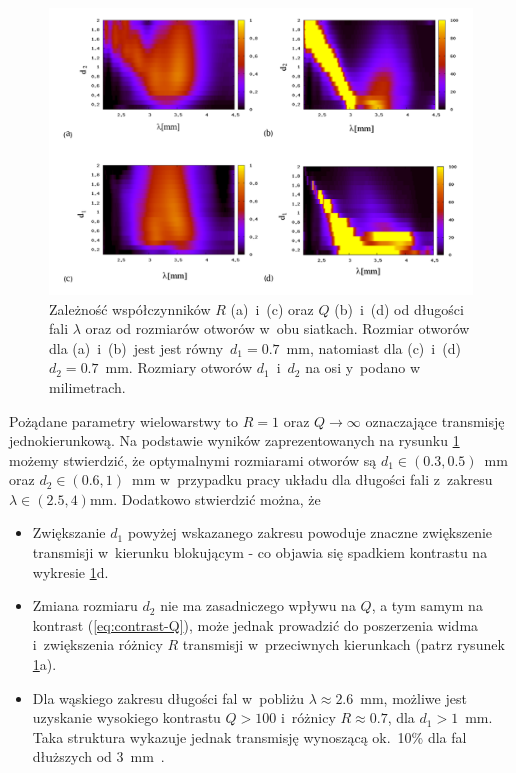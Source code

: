 \begin{figure}[tb]
	\includegraphics[width=\textwidth]{images/dmg/kontrast_maps.png}
	\caption{Zależność współczynników $R$ (a)~i~(c) oraz $Q$ (b)~i~(d) od długości fali $\lambda$ oraz od rozmiarów otworów w~obu siatkach. Rozmiar otworów dla (a)~i~(b)~jest jest równy~$d_1=0.7$~mm, natomiast dla (c)~i~(d) $d_2=0.7$~mm. Rozmiary otworów $d_1$~i~$d_2$ na osi y~podano w milimetrach.}
	\label{fig:qr-od-d}
\end{figure}

Pożądane parametry wielowarstwy to $R=1$ oraz $Q \to \infty$ oznaczające transmisję jednokierunkową. Na podstawie wyników zaprezentowanych na rysunku \ref{fig:qr-od-d} możemy stwierdzić, że optymalnymi rozmiarami otworów są $d_1\in(0.3,0.5)$~mm oraz $d_2\in(0.6,1)$~mm w~przypadku pracy układu dla długości fali z~zakresu $\lambda \in (2.5, 4)$mm. Dodatkowo stwierdzić można, że
\begin{itemize}
	\item Zwiększanie $d_1$ powyżej wskazanego zakresu powoduje znaczne zwiększenie transmisji w~kierunku blokującym - co objawia się spadkiem kontrastu na wykresie \ref{fig:qr-od-d}d.
	\item Zmiana rozmiaru $d_2$ nie ma zasadniczego wpływu na $Q$, a tym samym na kontrast (\ref{eq:contrast-Q}), może jednak prowadzić do poszerzenia widma i~zwiększenia różnicy $R$ transmisji w~przeciwnych kierunkach (patrz rysunek \ref{fig:qr-od-d}a).
	\item Dla wąskiego zakresu długości fal w~pobliżu $\lambda\approx2.6$~mm, możliwe jest uzyskanie wysokiego kontrastu $Q>100$ i~różnicy ${R\approx 0.7}$, dla ${d_1>1}$~mm. Taka struktura wykazuje jednak transmisję wynoszącą ok.~10\% dla fal dłuższych od $3$~mm~\cite{stolarek2013broadband}.
\end{itemize}
